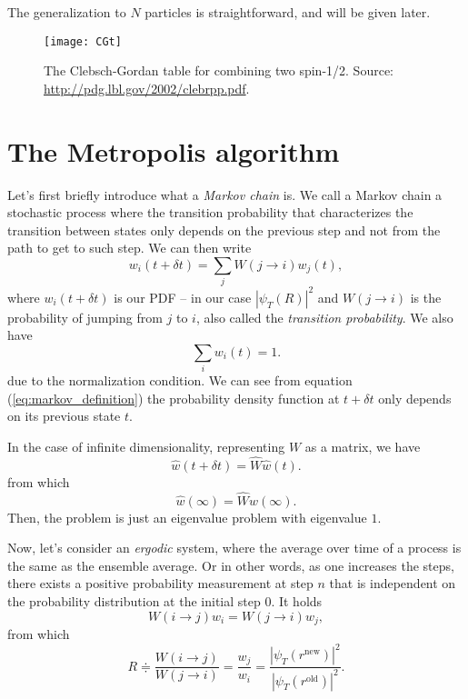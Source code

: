 The generalization to $N$ particles is straightforward, and will be given later.

\begin{figure}[H]
	\centering
	\texttt{[image: CGt]}
	\caption{The Clebsch-Gordan table for combining two spin-1/2. Source: \url{http://pdg.lbl.gov/2002/clebrpp.pdf}.}
	\label{fig:CGt}
\end{figure}

\section{The Metropolis algorithm}

Let's first briefly introduce what a \emph{Markov chain} is. We call a Markov chain a stochastic process where the transition probability that characterizes the transition between states only depends on the previous step and not from the path to get to such step. We can then write \citep[see][]{Hjorth-Jensen2014}
\begin{equation}
	w_i(t+\delta t)=\sum_j W(j \rightarrow i) w_j (t),
	\label{eq:markov_definition}
\end{equation}
where $w_i(t+\delta t)$ is our PDF -- in our case $|\psi_T(R)|^2$ and $W(j \rightarrow i)$ is the probability of jumping from $j$ to $i$, also called the \emph{transition probability}. We also have
\begin{equation}
	\sum_{i}w_i(t) = 1.
\end{equation}
due to the normalization condition. We can see from equation (\ref{eq:markov_definition}) the probability density function at $t+\delta t$ only depends on its previous state $t$. 

In the case of infinite dimensionality, representing $W$ as a matrix, we have
\begin{equation}
	\hat{w}(t+\delta t) = \hat{W}\hat{w}(t).
\end{equation}
from which
\begin{equation}
	\hat{w}(\infty)= \hat{W} \hat{w}(\infty).
\end{equation}
Then, the problem is just an eigenvalue problem with eigenvalue $1$.

Now, let's consider an \emph{ergodic} system, where the average over time of a process is the same as the ensemble average. Or in other words, as one increases the steps, there exists a positive probability measurement at step $n$ that is independent on the probability distribution at the initial step $0$. It holds
\begin{equation}
	W(i \rightarrow j) w_i= W(j \rightarrow i) w_j,
\end{equation}
from which
\begin{equation}
	R \doteqdot \frac{W(i \rightarrow j)}{W(j \rightarrow i)}=\frac{w_j}{w_i}=\frac{|\psi_T (r^{\text{new}})|^2}{|\psi_T (r^{\text{old}})|^2}.
\end{equation}


